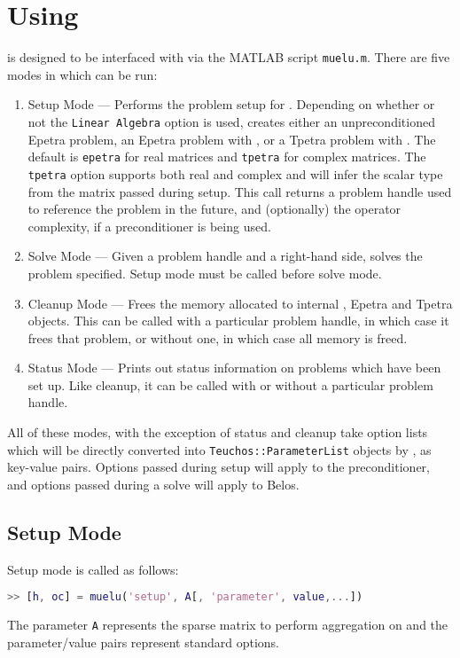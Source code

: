 \section{Using \muemex}\label{sec:muemex:usage}
\muemex is designed to be interfaced with via the MATLAB script
\texttt{muelu.m}.  There are five modes in which \muemex can be run:
\begin{enumerate}
\item Setup Mode --- Performs the problem setup for \muelu.
  Depending on whether or not the \texttt{Linear Algebra} option is
  used, \muemex creates either an unpreconditioned Epetra problem,
  an Epetra problem with \muelu, or a Tpetra problem with \muelu.
  The default is \texttt{epetra} for real matrices and \texttt{tpetra}
  for complex matrices. The \texttt{tpetra} option
  supports both real and complex and will infer the scalar type
  from the matrix passed during setup.  This call returns a problem
  handle used to reference the problem in the future, and (optionally)
  the operator complexity, if a preconditioner is being used.
\item Solve Mode --- Given a problem handle and a right-hand side, \muemex
  solves the problem specified.  Setup mode must be called before
  solve mode.
\item Cleanup Mode --- Frees the memory allocated to internal \muelu,
  Epetra and Tpetra objects.  This can be called with a particular
  problem handle, in which case it frees that problem, or without one,
  in which case all \muemex memory is freed.
\item Status Mode --- Prints out status information on problems which
  have been set up.  Like cleanup, it can be called with or without a
  particular problem handle.
\end{enumerate}
All of these modes, with the exception of status and cleanup take
option lists which will be directly converted into
\texttt{Teuchos::ParameterList} objects by \muemex, as key-value pairs.
Options passed during setup will apply to the \muelu preconditioner, and
options passed during a solve will apply to Belos.

\subsection{Setup Mode}
Setup mode is called as follows:
\begin{lstlisting}[language=Matlab]
  >> [h, oc] = muelu('setup', A[, 'parameter', value,...])
\end{lstlisting}
The parameter \texttt{A} represents the sparse matrix to perform aggregation on
and the parameter/value pairs represent standard \muelu options.

